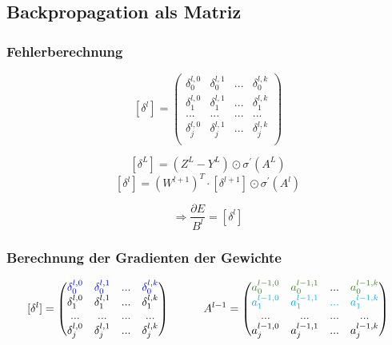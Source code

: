 \documentclass{article}
\begin{document}
 \subsection{Backpropagation als Matriz}

 \subsubsection{Fehlerberechnung}

 \[ [\delta^l] =
 \begin{pmatrix}
    \delta_0^{l,0} & \delta_0^{l,1} & ... & \delta_0^{l,k} \\
    \delta_1^{l,0} & \delta_1^{l,1} & ... & \delta_1^{l,k} \\
    ... & ... & ... & ... \\
    \delta_j^{l,0} & \delta_j^{l,1} & ... & \delta_j^{l,k} \\
 \end{pmatrix} \]

  \[ [\delta^L] = (Z^L - Y^L) \odot \sigma^{\prime}(A^L) \]
 \[ [\delta^l] = (W^{l+1})^T \cdot [\delta^{l+1}] \odot \sigma^{\prime}(A^l) \]

 \[ \Rightarrow  \frac{\partial E}{B^l} = [\delta^l]\]


\pagebreak


 \subsubsection{Berechnung der Gradienten der Gewichte}

 \[ [\delta^l] =
 \begin{pmatrix}
    \textcolor{blue}{\delta_0^{l,0}} & \textcolor{blue}{\delta_0^{l,1}} & \textcolor{blue}{...} & \textcolor{blue}{\delta_0^{l,k}} \\
    \delta_1^{l,0} & \delta_1^{l,1} & ... & \delta_1^{l,k} \\
    ... & ... & ... & ... \\
    \delta_j^{l,0} & \delta_j^{l,1} & ... & \delta_j^{l,k} \\
 \end{pmatrix} 
 \kern 30pt
 A^{l-1} = 
 \begin{pmatrix}
    \textcolor{OliveGreen}{a_0^{l-1,0}} & \textcolor{OliveGreen}{a_0^{l-1,1}} & ... & \textcolor{OliveGreen}{a_0^{l-1,k}} \\
    \textcolor{Cyan}{a_1^{l-1,0}} & \textcolor{Cyan}{a_1^{l-1,1}} & \textcolor{Cyan}{...} & \textcolor{Cyan}{a_1^{l-1,k}} \\
    ... & ... & ... & ... \\
    a_j^{l-1,0} & a_j^{l-1,1} & ... & a_j^{l-1,k} \\
 \end{pmatrix} \]
\end{document}
